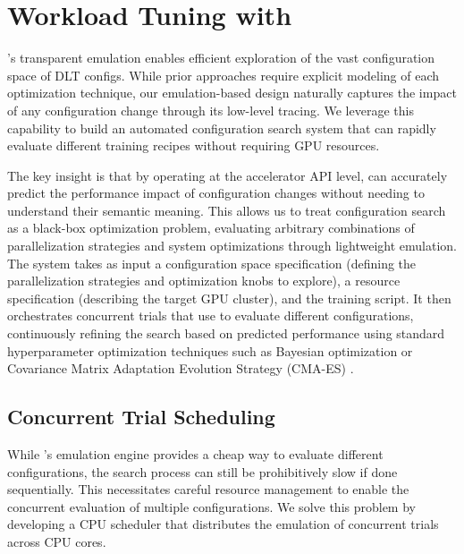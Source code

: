\vspace{-1em}
\section{Workload Tuning with \syssearchname}

\sysname's transparent emulation enables efficient exploration of the vast configuration space of DLT configs. While prior approaches require explicit modeling of each optimization technique, our emulation-based design naturally captures the impact of any configuration change through its low-level tracing. We leverage this capability to build an automated configuration search system that can rapidly evaluate different training recipes without requiring GPU resources.

The key insight is that by operating at the accelerator API level, \sysname can accurately predict the performance impact of configuration changes without needing to understand their semantic meaning. This allows us to treat configuration search as a black-box optimization problem, evaluating arbitrary combinations of parallelization strategies and system optimizations through lightweight emulation. The system takes as input a configuration space specification (defining the parallelization strategies and optimization knobs to explore), a resource specification (describing the target GPU cluster), and the training script. It then orchestrates concurrent trials that use \sysname to evaluate different configurations, continuously refining the search based on predicted performance using standard hyperparameter optimization techniques such as Bayesian optimization \cite{baysianoptimization} or Covariance Matrix Adaptation Evolution Strategy (CMA-ES) \cite{cma}.

\vspace{-1em}

\subsection{Concurrent Trial Scheduling} 

While \sysname's emulation engine provides a cheap way to evaluate different configurations, the search process can still be prohibitively slow if done sequentially. This necessitates careful resource management to enable the concurrent evaluation of multiple configurations. We solve this problem by developing a CPU scheduler that distributes the emulation of concurrent trials across CPU cores.

